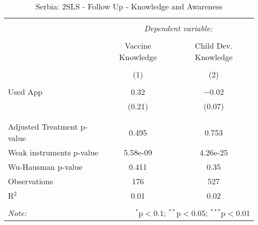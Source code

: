 
\begin{table}[!htbp] \centering 
  \caption{Serbia: 2SLS - Follow Up - Knowledge and Awareness} 
  \label{tbl:Serbia: 2SLS - Follow Up - Knowledge and Awareness} 
\begin{tabular}{@{\extracolsep{5pt}}lcc} 
\\[-1.8ex]\hline 
\hline \\[-1.8ex] 
 & \multicolumn{2}{c}{\textit{Dependent variable:}} \\ 
\cline{2-3} 
\\[-1.8ex] & Vaccine Knowledge & Child Dev. Knowledge \\ 
\\[-1.8ex] & (1) & (2)\\ 
\hline \\[-1.8ex] 
 Used App & 0.32 & $-$0.02 \\ 
  & (0.21) & (0.07) \\ 
  & & \\ 
\hline \\[-1.8ex] 
Adjusted Treatment p-value & 0.495 & 0.753 \\ 
Weak instruments p-value & 5.58e-09 & 4.26e-25 \\ 
Wu-Hausman p-value & 0.411 & 0.35 \\ 
Observations & 176 & 527 \\ 
R$^{2}$ & 0.01 & 0.02 \\ 
\hline 
\hline \\[-1.8ex] 
\textit{Note:}  & \multicolumn{2}{r}{$^{*}$p$<$0.1; $^{**}$p$<$0.05; $^{***}$p$<$0.01} \\ 
\end{tabular} 
\end{table} 
